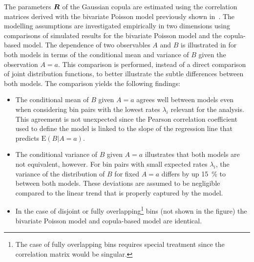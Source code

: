 The parameters $\bm{R}$ of the Gaussian copula are estimated using the
correlation matrices derived with the bivariate Poisson model previously shown
in~. The modelling assumptions are
investigated empirically in two dimensions using comparisons of simulated
results for the bivariate Poisson model and the copula-based model. The
dependence of two observables $A$ and $B$ is illustrated in
 for both models in terms of the conditional
mean and variance of $B$ given the observation $A = a$. This comparison is
performed, instead of a direct comparison of joint distribution functions, to
better illustrate the subtle differences between both models. The comparison
yields the following findings:
\begin{itemize}
\item The conditional mean of $B$ given $A = a$ agrees well between models even
  when considering bin pairs with the lowest rates $\lambda_i$ relevant for the
  analysis. This agreement is not unexpected since the Pearson correlation
  coefficient used to define the model is linked to the slope of the regression
  line that predicts $\mathrm{E}(B \vert A = a)$.

\item The conditional variance of $B$ given $A = a$ illustrates that both models
  are not equivalent, however. For bin pairs with small expected rates
  $\lambda_i$, the variance of the distribution of $B$ for fixed $A = a$ differs
  by up \SI{15}{\percent} to between both models. These deviations are assumed
  to be negligible compared to the linear trend that is properly captured by the
  model.

\item In the case of disjoint or fully overlapping\footnote{The case of fully
    overlapping bins requires special treatment since the correlation matrix
    would be singular.} bins (not shown in the figure) the bivariate Poisson
  model and copula-based model are identical.
\end{itemize}


